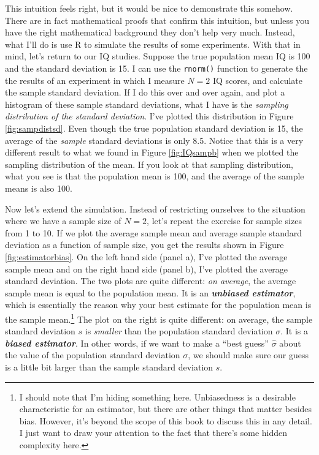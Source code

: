 \documentclass[
]{book}
\begin{document}
This intuition feels right, but it would be nice to demonstrate this somehow. There are in fact mathematical proofs that confirm this intuition, but unless you have the right mathematical background they don't help very much. Instead, what I'll do is use R to simulate the results of some experiments. With that in mind, let's return to our IQ studies. Suppose the true population mean IQ is 100 and the standard deviation is 15. I can use the \texttt{rnorm()} function to generate the the results of an experiment in which I measure \(N=2\) IQ scores, and calculate the sample standard deviation. If I do this over and over again, and plot a histogram of these sample standard deviations, what I have is the \emph{sampling distribution of the standard deviation}. I've plotted this distribution in Figure \ref{fig:sampdistsd}. Even though the true population standard deviation is 15, the average of the \emph{sample} standard deviations is only 8.5. Notice that this is a very different result to what we found in Figure \ref{fig:IQsampb} when we plotted the sampling distribution of the mean. If you look at that sampling distribution, what you see is that the population mean is 100, and the average of the sample means is also 100.

Now let's extend the simulation. Instead of restricting ourselves to the situation where we have a sample size of \(N=2\), let's repeat the exercise for sample sizes from 1 to 10. If we plot the average sample mean and average sample standard deviation as a function of sample size, you get the results shown in Figure \ref{fig:estimatorbias}. On the left hand side (panel a), I've plotted the average sample mean and on the right hand side (panel b), I've plotted the average standard deviation. The two plots are quite different: \emph{on average}, the average sample mean is equal to the population mean. It is an \textbf{\emph{unbiased estimator}}, which is essentially the reason why your best estimate for the population mean is the sample mean.\footnote{I should note that I'm hiding something here. Unbiasedness is a desirable characteristic for an estimator, but there are other things that matter besides bias. However, it's beyond the scope of this book to discuss this in any detail. I just want to draw your attention to the fact that there's some hidden complexity here.} The plot on the right is quite different: on average, the sample standard deviation \(s\) is \emph{smaller} than the population standard deviation \(\sigma\). It is a \textbf{\emph{biased estimator}}. In other words, if we want to make a ``best guess'' \(\hat\sigma\) about the value of the population standard deviation \(\sigma\), we should make sure our guess is a little bit larger than the sample standard deviation \(s\).
\end{document}
